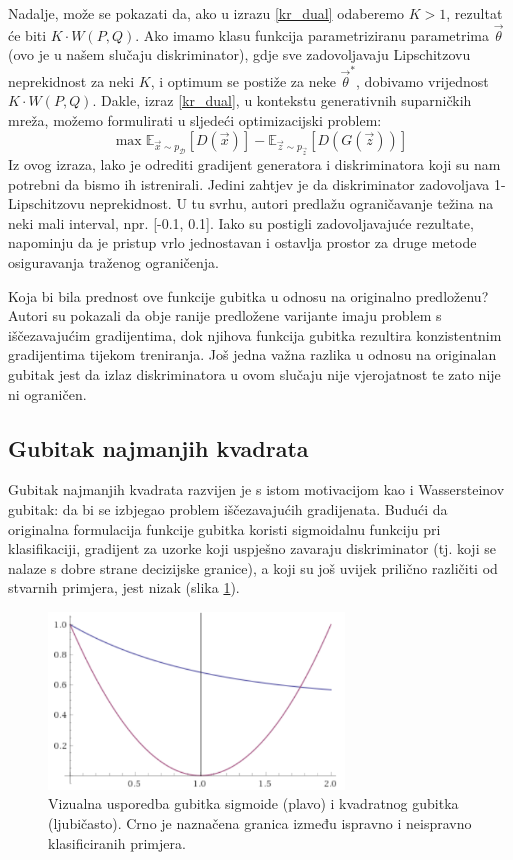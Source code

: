 Nadalje, može se pokazati da, ako u izrazu \ref{kr_dual} odaberemo $K > 1$, rezultat će biti $K \cdot W(P, Q)$. Ako imamo klasu funkcija parametriziranu parametrima $\vec{\theta}$ (ovo je u našem slučaju diskriminator), gdje sve zadovoljavaju Lipschitzovu neprekidnost za neki $K$, i optimum se postiže za neke $\vec{\theta}^*$, dobivamo vrijednost $K \cdot W(P, Q)$. Dakle, izraz \ref{kr_dual}, u kontekstu generativnih suparničkih mreža, možemo formulirati u sljedeći optimizacijski problem:
\begin{equation}
\max \mathbb{E}_{\vec{x} \sim p_{\mathcal{D}}} \left[D(\vec{x})\right] - \mathbb{E}_{\vec{z} \sim p_{\vec{z}}}\left[D(G(\vec{z}))\right]
\end{equation}
Iz ovog izraza, lako je odrediti gradijent generatora i diskriminatora koji su nam potrebni da bismo ih istrenirali. Jedini zahtjev je da diskriminator zadovoljava 1-Lipschitzovu neprekidnost. U tu svrhu, autori predlažu ograničavanje težina na neki mali interval, npr. [-0.1, 0.1]. Iako su postigli zadovoljavajuće rezultate, napominju da je pristup vrlo jednostavan i ostavlja prostor za druge metode osiguravanja traženog ograničenja.

Koja bi bila prednost ove funkcije gubitka u odnosu na originalno predloženu? Autori su pokazali da obje ranije predložene varijante imaju problem s iščezavajućim gradijentima, dok njihova funkcija gubitka rezultira konzistentnim gradijentima tijekom treniranja. Još jedna važna razlika u odnosu na originalan gubitak jest da izlaz diskriminatora u ovom slučaju nije vjerojatnost te zato nije ni ograničen.

\subsection{Gubitak najmanjih kvadrata}
Gubitak najmanjih kvadrata \citep{mao2016squares} razvijen je s istom motivacijom kao i Wassersteinov gubitak: da bi se izbjegao problem iščezavajućih gradijenata. Budući da originalna formulacija funkcije gubitka koristi sigmoidalnu funkciju pri klasifikaciji, gradijent za uzorke koji uspješno zavaraju diskriminator (tj. koji se nalaze s dobre strane decizijske granice), a koji su još uvijek prilično različiti od stvarnih primjera, jest nizak (slika \ref{ls_sigm}). 

\begin{figure}[h]
\centering
		\includegraphics[width=0.7\textwidth]{images/ls_sigm.png}
\caption{Vizualna usporedba gubitka sigmoide (plavo) i kvadratnog gubitka (ljubičasto). Crno je naznačena granica između ispravno i neispravno klasificiranih primjera.}
\label{ls_sigm}
\end{figure}

